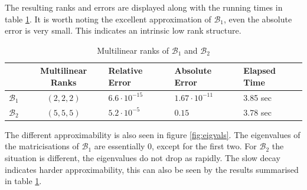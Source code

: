 \documentclass[%
a4paper,
parskip=half,
DIV=calc,
]
{scrartcl}
\begin{document}
The resulting ranks and errors are displayed along with the running
times in table \ref{tab:hosvdrk}.  It is worth noting the excellent
approximation of $\mathcal{B}_1$, even the absolute error is very
small.  This indicates an intrinsic low rank structure.
\begin{table}[h]
  \centering
  \begin{tabular}[]{cclll}
    & Multilinear Ranks & Relative Error & Absolute Error & Elapsed Time\\ \hline
    $\mathcal{B}_1$ & $(2,2,2)$ & $6.6 \cdot 10^{-15}$  & $1.67 \cdot 10^{-11}$ & 3.85 sec\\
    $\mathcal{B}_2$ & $(5,5,5)$ & $5.2 \cdot 10^{- 5}$  & $0.15$  & 3.78 sec\\
  \end{tabular}
  \caption{Multilinear ranks of $\mathcal{B}_1$ and $\mathcal{B}_2$}
  \label{tab:hosvdrk}
\end{table}
The different approximability is also seen in figure
\ref{fig:eigvals}.  The eigenvalues of the matricisations of
$\mathcal{B}_1$ are essentially 0, except for the first two.  For
$\mathcal{B}_2$ the situation is different, the eigenvalues do not
drop as rapidly.  The slow decay indicates harder approximability,
this can also be seen by the results summarised in table
\ref{tab:hosvdrk}.
\end{document}
